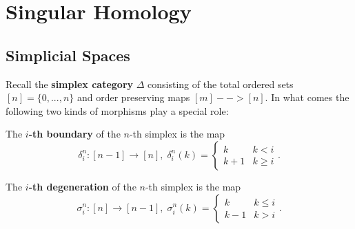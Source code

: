 	\newpage
	\section{Singular Homology}
	\subsection{Simplicial Spaces}

	Recall the \textbf{simplex category} $\Delta$ consisting of the total ordered sets $[n] = \{0,...,n\}$ and order preserving maps $[m] --> [n]$. In what comes the following two kinds of morphisms play a special role:

	\begin{minipage}{.65\textwidth}
		The \textbf{$i$-th boundary} of the $n$-th simplex is the map
		\begin{equation*}
			\delta_i^n: [n-1] \longrightarrow [n],\; \delta_i^n(k) = \left\{\begin{array}{ll}
				k & k<i\\
				k+1 & k\geq i
			\end{array}\right..
		\end{equation*}
	\end{minipage}
	\begin{minipage}{.35\textwidth}
		\vspace{.8cm}
		\begin{center}
		\end{center}
	\end{minipage}
	\begin{minipage}{.65\textwidth}
		The \textbf{$i$-th degeneration} of the $n$-th simplex is the map
		\begin{equation*}
			\sigma_i^n: [n] \longrightarrow [n-1],\; \sigma_i^n(k) = \left\{\begin{array}{ll}
				k & k\leq i\\
				k-1 & k > i
			\end{array}\right..
		\end{equation*}
	\end{minipage}
